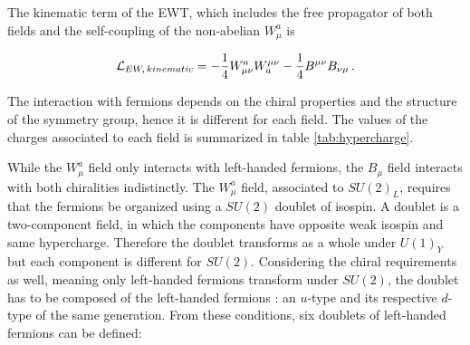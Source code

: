 The kinematic term of the EWT, which includes the free propagator of both fields and the self-coupling of the non-abelian $W_{\mu}^a$ is

\begin{equation}
    \Lagr_{EW,\,kinematic} = -\frac{1}{4}W_{\mu\nu}^a W^{\mu\nu}_a - \frac{1}{4} B^{\mu\nu}B_{\nu\mu} \mend
\end{equation}

The interaction with fermions depends on the chiral properties and the structure of the symmetry group, hence it is different for each field. The values of the charges associated to each field is summarized in table \ref{tab:hypercharge}.

\begin{table}[h]
    \centering
    \caption{Values of the electroweak charges (weak isospin $I_3$, hypercharge $Y$ and electromagnetic charge $Q$) for the fermions, according to their type and chirality.}
    \label{tab:hypercharge}
\end{table}

While the $W_{\mu}^a$ field only interacts with left-handed fermions, the $B_{\mu}$ field interacts with both chiralities indistinctly.
The $W_{\mu}^a$ field, associated to $SU(2)_L$, requires that the fermions be organized using a $SU(2)$ doublet of isospin. A doublet is a two-component field, in which the components have opposite weak isospin and same hypercharge. Therefore the doublet transforms as a whole under $U(1)_Y$ but each component is different for $SU(2)$. Considering the chiral requirements as well, meaning only left-handed fermions transform under $SU(2)$, the doublet has to be composed of the left-handed fermions : an $u$-type and its respective $d$-type of the same generation. From these conditions, six doublets of left-handed fermions can be defined:

